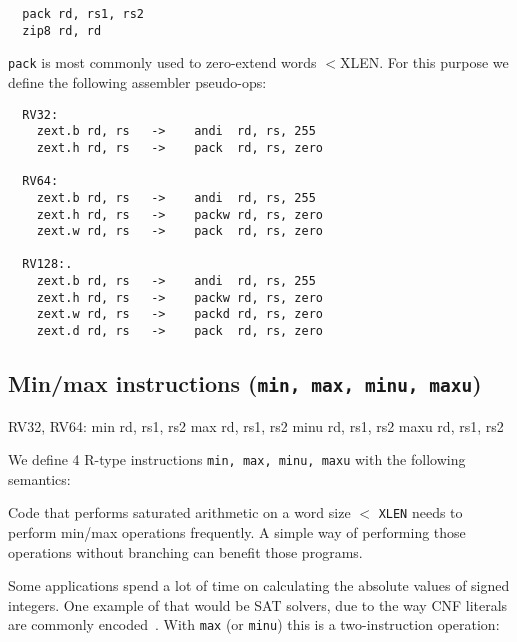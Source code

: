 \begin{minipage}{\linewidth}
\begin{verbatim}
  pack rd, rs1, rs2
  zip8 rd, rd
\end{verbatim}
\end{minipage}

{\tt pack} is most commonly used to zero-extend words $<$XLEN.
For this purpose we define the following assembler pseudo-ops:

\begin{minipage}{\linewidth}
\begin{verbatim}
  RV32:
    zext.b rd, rs   ->    andi  rd, rs, 255
    zext.h rd, rs   ->    pack  rd, rs, zero

  RV64:
    zext.b rd, rs   ->    andi  rd, rs, 255
    zext.h rd, rs   ->    packw rd, rs, zero
    zext.w rd, rs   ->    pack  rd, rs, zero

  RV128:.
    zext.b rd, rs   ->    andi  rd, rs, 255
    zext.h rd, rs   ->    packw rd, rs, zero
    zext.w rd, rs   ->    packd rd, rs, zero
    zext.d rd, rs   ->    pack  rd, rs, zero
\end{verbatim}
\end{minipage}


\subsection{Min/max instructions (\texttt{min, max, minu, maxu})}

\begin{rvb}
  RV32, RV64:
    min  rd, rs1, rs2
    max  rd, rs1, rs2
    minu rd, rs1, rs2
    maxu rd, rs1, rs2
\end{rvb}

We define 4 R-type instructions \texttt{min, max, minu, maxu} with the
following semantics:



Code that performs saturated arithmetic on a word size $<$ \texttt{XLEN} needs to perform
min/max operations frequently. A simple way of performing those operations without branching
can benefit those programs.

Some applications spend a lot of time on calculating the absolute values of
signed integers. One example of that would be SAT solvers, due to the way CNF
literals are commonly encoded~\cite{BiereComm}. With \texttt{max} (or
\texttt{minu}) this is a two-instruction operation:

